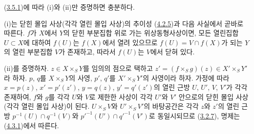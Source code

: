 (\hyperref[I.3.5.1-ko]{3.5.1})에 따라 (i)와 (ii)만 증명하면 충분하다.

(i)는 닫힌 몰입 사상(각각 열린 몰입 사상)의 추이성
(\hyperref[I.4.2.5-ko]{4.2.5})과 다음 사실에서 곧바로 따른다. $f$가
$X$에서 $Y$의 닫힌 부분집합 위로 가는 위상동형사상이면, 모든
열린집합 $U\subset X$에 대하여 $f(U)$는 $f(X)$에서 열려 있으므로
$f(U)=V\cap f(X)$가 되는 $Y$의 열린 부분집합 $V$가 존재하고, 따라서
$f(U)$는 $V$에서 닫혀 있다.

(ii)를 증명하자. $z\in X\times_S Y$를 임의의 점으로 택하고
$z'=(f\times_S g)(z)\in X'\times_S Y'$라 하자. $p$, $q$를
$X\times_S Y$의 사영, $p'$, $q'$를 $X'\times_S Y'$의 사영이라 하자.
가정에 따라 $x=p(z)$, $x'=p'(z')$, $y=q(z)$, $y'=q'(z')$의 열린
근방 $U$, $U'$, $V$, $V'$가 각각 존재하여, $f$와 $g$를 각각 $U$와
$V$로 제한한 사상이 각각 $U'$와 $V'$ 안으로의 닫힌 몰입 사상(각각
열린 몰입 사상)이 된다. $U\times_S V$와 $U'\times_S V'$의
바탕공간은 각각 $z$와 $z'$의 열린 근방
$p^{-1}(U)\cap q^{-1}(V)$와
${p'}^{-1}(U')\cap{q'}^{-1}(V')$로 동일시되므로
(\hyperref[I.3.2.7-ko]{3.2.7}), 명제는
(\hyperref[I.4.3.1-ko]{4.3.1})에서 따른다.
